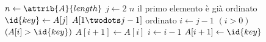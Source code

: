 \begin{codebox}
\li $n \gets \attrib{A}{length}$
\li \For $j \gets 2$ \To $n$
		\Comment il primo elemento è già ordinato
\li	\Do
		$\id{key} \gets A[j]$ 
			\Comment $A[1 \twodots j-1]$ ordinato
\li		$i \gets j-1$
\li		\While $(i > 0)$ \And $(A[i] > \id{key})$
\li		\Do
			$A[i+1] \gets A[i]$
\li			$i \gets i-1$
		\End
\li		$A[i+1] \gets \id{key}$
	\End
\end{codebox}